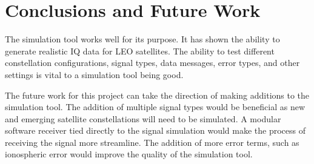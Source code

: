 \documentclass[12pt]{report}
\begin{document}
\chapter{Conclusions and Future Work}
The simulation tool works well for its purpose. It has shown the ability to generate realistic IQ data for LEO satellites. The ability to test different constellation configurations, signal types, data messages, error types, and other settings is vital to a simulation tool being good. 

The future work for this project can take the direction of making additions to the simulation tool. The addition of multiple signal types would be beneficial as new and emerging satellite constellations will need to be simulated. A modular software receiver tied directly to the signal simulation would make the process of receiving the signal more streamline. The addition of more error terms, such as ionospheric error would improve the quality of the simulation tool. 





%





\end{document}
